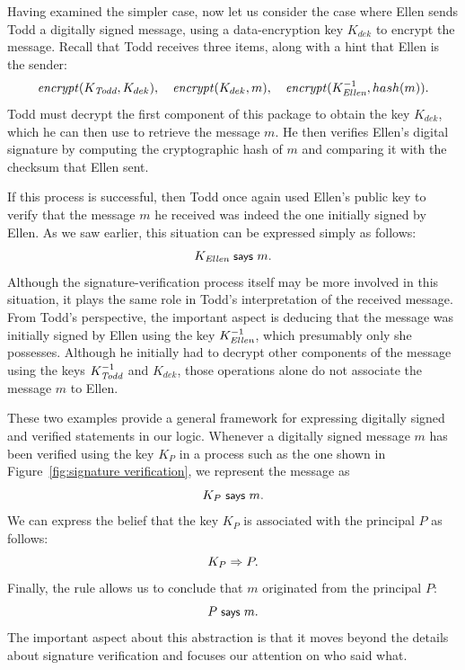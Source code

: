 Having examined the simpler case, now let us consider the case where
Ellen sends Todd a digitally signed message, using a data-encryption key
$K_{dek}$ to encrypt the message.  Recall that Todd receives three items,
along with a hint that Ellen is the sender:
\[ \mathit{encrypt}(K_{\textit{Todd}}, K_{dek}), \quad
\mathit{encrypt}(K_{dek},m), \quad
\mathit{encrypt}(K^{-1}_{\textit{Ellen}},hash(m)). \]
Todd must decrypt the first component of this package to
obtain the key $K_{dek}$, which he can then use to retrieve the message
$m$.  He then verifies Ellen's digital signature by computing the
cryptographic hash of $m$ and comparing it with the checksum that Ellen
sent.  

If this process is successful, then Todd once again used Ellen's public
key to verify that the message $m$ he received was indeed the one
initially signed by Ellen.  As we saw earlier, this situation can be
expressed simply as follows:
\[ K_{\textit{Ellen}} \text{\small\textsf{ says }} m .\]
Although the signature-verification process itself may be more involved
in this situation, it plays the same role in Todd's interpretation of the
received message.  From Todd's perspective, the important aspect is
deducing that the message was initially signed by Ellen using the key
$K^{-1}_{\textit{Ellen}}$, which presumably only she possesses. Although
he initially had to decrypt other components of the message using the
keys $K^{-1}_{\textit{Todd}}$ and $K_{dek}$, those operations alone do
not associate the message $m$ to Ellen.




These two examples provide a general framework for expressing digitally
signed and verified statements in our logic.    
Whenever a digitally signed message $m$ has been verified
using the key $K_P$ in a process such as the one shown in
Figure~\ref{fig:signature verification}, we represent the message as
\[K_P \text{\small\textsf{ says }} m. \]
We can express the belief that the key $K_P$ is associated with the
principal $P$ as follows:
\[ K_P \Rightarrow P. \]
Finally, the  rule allows us to conclude that $m$
originated from the principal $P$:
\[P \text{\small\textsf{ says }} m. \] The important aspect about this abstraction is that it
moves beyond the details about signature verification and focuses our
attention on who said what.

